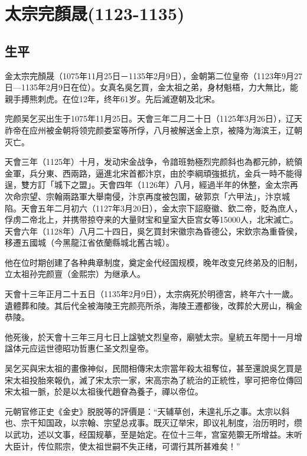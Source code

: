 
\section{太宗完顏晟\tiny(1123-1135)}

\subsection{生平}

金太宗完顏晟（1075年11月25日－1135年2月9日），金朝第二位皇帝（1123年9月27日—1135年2月9日在位）。女真名吳乞買，金太祖之弟，身材魁梧，力大無比，能親手搏熊刺虎。在位12年，终年61岁。先后滅遼朝及北宋。

完颜吴乞买出生于1075年11月25日。天會三年二月二十日（1125年3月26日），辽天祚帝在应州被金朝将领完颜娄室等所俘，八月被解送金上京，被降为海滨王，辽朝灭亡。

天會三年（1125年）十月，发动宋金战争，令諳班勃極烈完颜斜也為都元帥，統領金軍，兵分東、西兩路，逼進北宋首都汴京，由於李綱頑強抵抗，金兵一時不能得逞，雙方訂「城下之盟」。天會四年（1126年）八月，經過半年的休整，金太宗再次命宗望、宗翰兩路軍大舉南侵，汴京再度被包圍，破郭京「六甲法」，汴京城陷。天會五年二月初六（1127年3月20日），金太宗下詔廢徽、欽二帝，貶為庶人，俘虏二帝北上，并携带掠夺来的大量财宝和皇室大臣宫女等15000人，北宋滅亡。天會六年（1128年）八月二十四日，吳乞買封宋徽宗為昏德公，宋欽宗為重昏侯，移遷五國城（今黑龍江省依蘭縣城北舊古城）。

他在位时期创建了各种典章制度，奠定金代经国规模，晚年改变兄终弟及的旧制，立太祖孙完颜亶（金熙宗）为继承人。

天會十三年正月二十五日（1135年2月9日），太宗病死於明德宮，終年六十一歲。遺體葬和陵。其后代全被海陵王完颜亮所杀，海陵王遷都後，改葬於大房山，稱金恭陵。

他死後，於天會十三年三月七日上諡號文烈皇帝，廟號太宗。皇統五年閏十一月增諡体元应运世德昭功哲惠仁圣文烈皇帝。

吴乞买與宋太祖的畫像神似，民間相傳宋太宗當年殺太祖奪位，甚至還說吳乞買是宋太祖投胎來報仇，滅了宋太宗一家，宋高宗為了統治的正統性，寧可把帝位傳回宋太祖一脈，於是以太祖後代趙眘為養子，禪以帝位。

元朝官修正史《金史》脱脱等的評價是：“天辅草创，未遑礼乐之事。太宗以斜也、宗干知国政，以宗翰、宗望总戎事。既灭辽举宋，即议礼制度，治历明时，缵以武功，述以文事，经国规摹，至是始定。在位十三年，宫室苑籞无所增益。末听大臣计，传位熙宗，使太祖世嗣不失正绪，可谓行其所甚难矣！”

